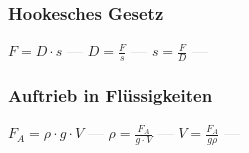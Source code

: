 \subsubsection{Hookesches Gesetz} 
\begin{minipage}{0.45\textwidth} 
\end{minipage} 
\begin{minipage}{0.45\textwidth} 
 
\end{minipage} 
$ F = D\cdot s $ \textcolor{lightgray}{\textbf{---}} 
$ D = \frac{F}{s} $ \textcolor{lightgray}{\textbf{---}} 
$ s = \frac{F}{D} $ \textcolor{lightgray}{\textbf{---}} 

\subsubsection{Auftrieb in Flüssigkeiten} 
\begin{minipage}{0.45\textwidth} 
\end{minipage} 
\begin{minipage}{0.45\textwidth} 
 
\end{minipage} 
$ F_{A}  =  \rho \cdot g\cdot V $ \textcolor{lightgray}{\textbf{---}} 
$ \rho  = \frac{F_{A} }{g\cdot V} $ \textcolor{lightgray}{\textbf{---}} 
$ V = \frac{F_{A} }{g \rho } $ \textcolor{lightgray}{\textbf{---}} 

